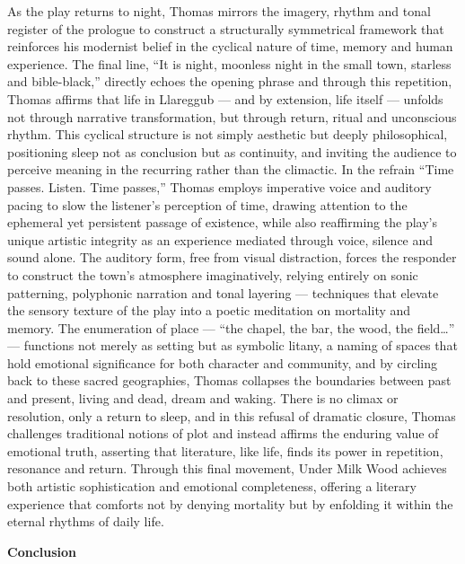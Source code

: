 		As the play returns to night, Thomas mirrors the imagery, rhythm and tonal register of the prologue to construct a structurally symmetrical framework that reinforces his modernist belief in the cyclical nature of time, memory and human experience. The final line, “It is night, moonless night in the small town, starless and bible-black,” directly echoes the opening phrase and through this repetition, Thomas affirms that life in Llareggub — and by extension, life itself — unfolds not through narrative transformation, but through return, ritual and unconscious rhythm. This cyclical structure is not simply aesthetic but deeply philosophical, positioning sleep not as conclusion but as continuity, and inviting the audience to perceive meaning in the recurring rather than the climactic. In the refrain “Time passes. Listen. Time passes,” Thomas employs imperative voice and auditory pacing to slow the listener’s perception of time, drawing attention to the ephemeral yet persistent passage of existence, while also reaffirming the play’s unique artistic integrity as an experience mediated through voice, silence and sound alone. The auditory form, free from visual distraction, forces the responder to construct the town’s atmosphere imaginatively, relying entirely on sonic patterning, polyphonic narration and tonal layering — techniques that elevate the sensory texture of the play into a poetic meditation on mortality and memory. The enumeration of place — “the chapel, the bar, the wood, the field…” — functions not merely as setting but as symbolic litany, a naming of spaces that hold emotional significance for both character and community, and by circling back to these sacred geographies, Thomas collapses the boundaries between past and present, living and dead, dream and waking. There is no climax or resolution, only a return to sleep, and in this refusal of dramatic closure, Thomas challenges traditional notions of plot and instead affirms the enduring value of emotional truth, asserting that literature, like life, finds its power in repetition, resonance and return. Through this final movement, Under Milk Wood achieves both artistic sophistication and emotional completeness, offering a literary experience that comforts not by denying mortality but by enfolding it within the eternal rhythms of daily life.

	\textbf{Conclusion}

